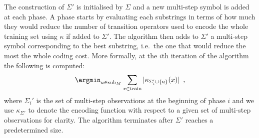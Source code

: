 The construction of $\Sigma'$ is initialised by $\Sigma$ and a new multi-step symbol is added at each phase. A phase starts by evaluating each substrings in terms of how much they would reduce the number of transition operators used to encode the whole training set using $\kappa$ if added to $\Sigma'$. The algorithm then adds to $\Sigma'$ a multi-step symbol corresponding to the best substring, i.e.\ the one that would reduce the most the whole coding cost. More formally, at the $i$th iteration of the algorithm the following is computed:
\begin{equation*}
\argmin_{u \in \mathrm{sub}_M} \sum_{x \in \mathrm{train}} |\kappa_{\Sigma_i' \cup \{u\}}(x)| \enspace,
\end{equation*}
where $\Sigma_i'$ is the set of multi-step observations at the beginning of phase $i$ and we use $\kappa_{\Sigma'}$ to denote the encoding function with respect to a given set of multi-step observations for clarity. The algorithm terminates after $\Sigma'$ reaches a predetermined size.

